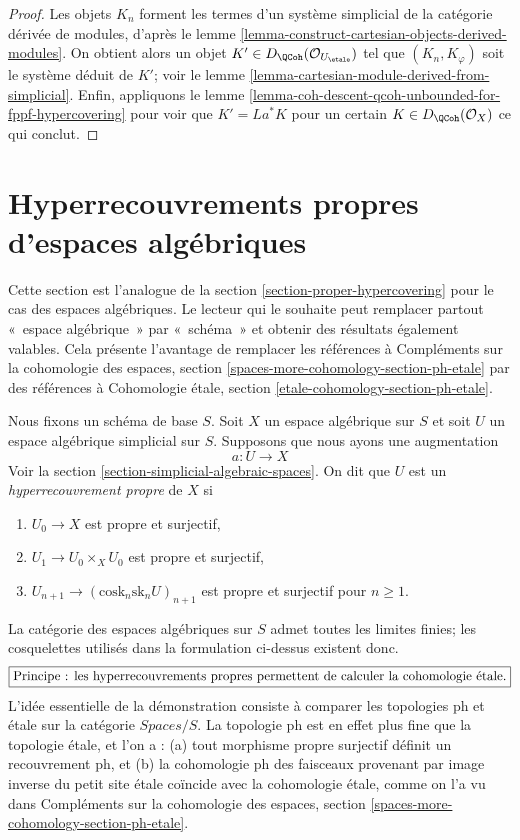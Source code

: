 \begin{proof}
Les objets $K_n$ forment les termes d'un système simplicial de la
catégorie dérivée de modules, d'après le
lemme \ref{lemma-construct-cartesian-objects-derived-modules}.
On obtient alors un objet
$K' \in D_\QCoh(\mathcal{O}_{U_\etale})$
tel que $(K_n, K_\varphi)$ soit le système déduit de $K'$; voir le lemme
\ref{lemma-cartesian-module-derived-from-simplicial}.
Enfin, appliquons le lemme
\ref{lemma-coh-descent-qcoh-unbounded-for-fppf-hypercovering}
pour voir que $K' = La^*K$ pour un certain $K \in D_\QCoh(\mathcal{O}_X)$
ce qui conclut.
\end{proof}











\section{Hyperrecouvrements propres d'espaces algébriques}
\label{section-proper-hypercovering-spaces}

\noindent
Cette section est l'analogue de la section \ref{section-proper-hypercovering}
pour le cas des espaces algébriques.
Le lecteur qui le souhaite peut remplacer partout « espace algébrique »
par « schéma » et obtenir des résultats également valables.
Cela présente l'avantage de remplacer les références à
Compléments sur la cohomologie des espaces, section
\ref{spaces-more-cohomology-section-ph-etale}
par des références à
Cohomologie étale, section \ref{etale-cohomology-section-ph-etale}.

\medskip\noindent
Nous fixons un schéma de base $S$.
Soit $X$ un espace algébrique sur $S$ et soit $U$ un espace algébrique simplicial
sur $S$. Supposons que nous ayons une augmentation
$$
a : U \to X
$$
Voir la section \ref{section-simplicial-algebraic-spaces}.
On dit que $U$ est un {\it hyperrecouvrement propre} de $X$ si
\begin{enumerate}
\item $U_0 \to X$ est propre et surjectif,
\item $U_1 \to U_0 \times_X U_0$ est propre et surjectif,
\item $U_{n + 1} \to (\text{cosk}_n\text{sk}_n U)_{n + 1}$
est propre et surjectif pour $n \geq 1$.
\end{enumerate}
La catégorie des espaces algébriques sur $S$ admet toutes les limites finies; les cosquelettes
utilisés dans la formulation ci-dessus existent donc.
$$
\fbox{Principe : les hyperrecouvrements propres permettent de
calculer la cohomologie étale.}
$$
L'idée essentielle de la démonstration consiste à comparer les topologies
ph et \'etale sur la catégorie $\textit{Spaces}/S$.
La topologie ph est en effet plus fine que la topologie \'etale, et l'on a :
(a) tout morphisme propre surjectif définit un recouvrement ph, et
(b) la cohomologie ph des faisceaux provenant par image inverse du petit site étale
coïncide avec la cohomologie étale, comme on l'a vu dans
Compléments sur la cohomologie des espaces, section
\ref{spaces-more-cohomology-section-ph-etale}.

